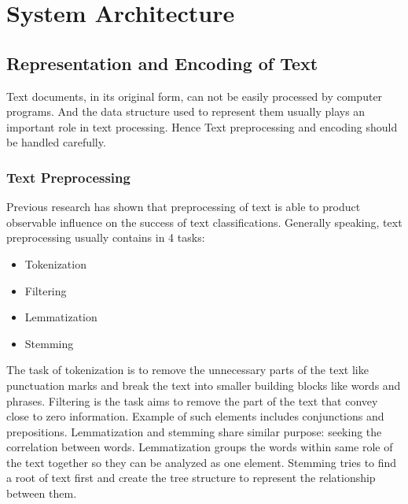 \documentclass[conference]{IEEEtran}
\begin{document}
\section{System Architecture}
\label{model}
\subsection{Representation and Encoding of Text}
\label{model:represent}
    Text documents, in its original form, can not be easily processed
    by computer programs. And the data structure used to represent them usually plays
    an important role in text processing\cite{hotho2005brief,allahyari2017brief}. Hence
    Text preprocessing and encoding should be handled carefully.

\subsubsection{Text Preprocessing}
\label{model:represent:preprocess}
    Previous research has shown that preprocessing of text is able to product observable
    influence on the success of text classifications\cite{uysal2014impact}.
    Generally speaking, text preprocessing usually contains in 4
    tasks\cite{allahyari2017brief}:
    \begin{itemize}
        \item Tokenization
        \item Filtering
        \item Lemmatization
        \item Stemming
    \end{itemize}

    The task of tokenization is to remove the unnecessary parts of the text like
    punctuation marks and break the text into smaller building blocks like words and
    phrases\cite{webster1992tokenization}.
    Filtering is the task aims to remove the part of the text that convey close to zero
    information. Example of such elements includes conjunctions and
    prepositions\cite{silva2003importance}.
    Lemmatization and stemming share similar purpose: seeking the correlation between words.
    Lemmatization groups the words within same role of the text together so they can be
    analyzed as one element. Stemming tries to find a root of text first and create the tree
    structure to represent the relationship between them\cite{hull1996stemming}.
\end{document}
